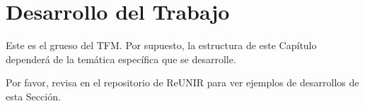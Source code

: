 \chapter{Desarrollo del Trabajo}
Este es el grueso del TFM. Por supuesto, la estructura de este Capítulo dependerá de la temática  específica que se desarrolle.

Por favor, revisa en el repositorio de ReUNIR para ver ejemplos de desarrollos de esta Sección.
